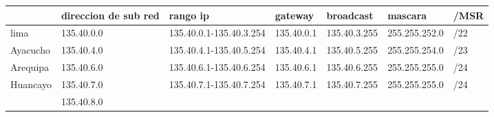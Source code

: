 \begin{table}[htbp]
\begin{tabular}{@{}lllllll@{}}
\toprule
\rowcolor[HTML]{32CB00} 
\multicolumn{1}{|l|}{\cellcolor[HTML]{32CB00}\textbf{subred}} & \multicolumn{1}{l|}{\cellcolor[HTML]{32CB00}\textbf{direccion de sub red}} & \multicolumn{1}{l|}{\cellcolor[HTML]{32CB00}\textbf{rango ip}} & \multicolumn{1}{l|}{\cellcolor[HTML]{32CB00}\textbf{gateway}} & \multicolumn{1}{l|}{\cellcolor[HTML]{32CB00}\textbf{broadcast}} & \multicolumn{1}{l|}{\cellcolor[HTML]{32CB00}\textbf{mascara}} & \multicolumn{1}{l|}{\cellcolor[HTML]{32CB00}\textbf{/MSR}} \\ \midrule
\multicolumn{1}{|l|}{lima}                                    & \multicolumn{1}{l|}{135.40.0.0}                                            & \multicolumn{1}{l|}{135.40.0.1-135.40.3.254}                   & \multicolumn{1}{l|}{135.40.0.1}                               & \multicolumn{1}{l|}{135.40.3.255}                               & \multicolumn{1}{l|}{255.255.252.0}                            & \multicolumn{1}{l|}{/22}                                   \\ \midrule
\multicolumn{1}{|l|}{Ayacucho}                                & \multicolumn{1}{l|}{135.40.4.0}                                            & \multicolumn{1}{l|}{135.40.4.1-135.40.5.254}                   & \multicolumn{1}{l|}{135.40.4.1}                               & \multicolumn{1}{l|}{135.40.5.255}                               & \multicolumn{1}{l|}{255.255.254.0}                            & \multicolumn{1}{l|}{/23}                                   \\ \midrule
\multicolumn{1}{|l|}{Arequipa}                                & \multicolumn{1}{l|}{135.40.6.0}                                            & \multicolumn{1}{l|}{135.40.6.1-135.40.6.254}                   & \multicolumn{1}{l|}{135.40.6.1}                               & \multicolumn{1}{l|}{135.40.6.255}                               & \multicolumn{1}{l|}{255.255.255.0}                            & \multicolumn{1}{l|}{/24}                                   \\ \midrule
\multicolumn{1}{|l|}{Huancayo}                                & \multicolumn{1}{l|}{135.40.7.0}                                            & \multicolumn{1}{l|}{135.40.7.1-135.40.7.254}                   & \multicolumn{1}{l|}{135.40.7.1}                               & \multicolumn{1}{l|}{135.40.7.255}                               & \multicolumn{1}{l|}{255.255.255.0}                            & \multicolumn{1}{l|}{/24}                                   \\ \midrule
                                                              & 135.40.8.0                                                                 &                                                                &                                                               &                                                                 &                                                               &                                                           
\end{tabular}
\end{table}

